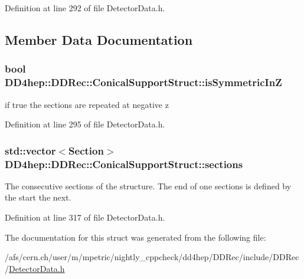 Definition at line 292 of file DetectorData.h.

\subsection{Member Data Documentation}
\hypertarget{struct_d_d4hep_1_1_d_d_rec_1_1_conical_support_struct_a9cb0f5d34f19a983ca5336b6c82f52d2}{
\subsubsection[{isSymmetricInZ}]{\setlength{\rightskip}{0pt plus 5cm}bool {\bf DD4hep::DDRec::ConicalSupportStruct::isSymmetricInZ}}}
\label{struct_d_d4hep_1_1_d_d_rec_1_1_conical_support_struct_a9cb0f5d34f19a983ca5336b6c82f52d2}


if true the sections are repeated at negative z 

Definition at line 295 of file DetectorData.h.\hypertarget{struct_d_d4hep_1_1_d_d_rec_1_1_conical_support_struct_ae2b42dab35860f91bf4b048850f1e63b}{
\subsubsection[{sections}]{\setlength{\rightskip}{0pt plus 5cm}std::vector$<${\bf Section}$>$ {\bf DD4hep::DDRec::ConicalSupportStruct::sections}}}
\label{struct_d_d4hep_1_1_d_d_rec_1_1_conical_support_struct_ae2b42dab35860f91bf4b048850f1e63b}
The consecutive sections of the structure. The end of one sections is defined by the start the next. 

Definition at line 317 of file DetectorData.h.

The documentation for this struct was generated from the following file:\begin{DoxyCompactItemize}
\item 
/afs/cern.ch/user/m/mpetric/nightly\_\-cppcheck/dd4hep/DDRec/include/DDRec/\hyperlink{_detector_data_8h}{DetectorData.h}\end{DoxyCompactItemize}
